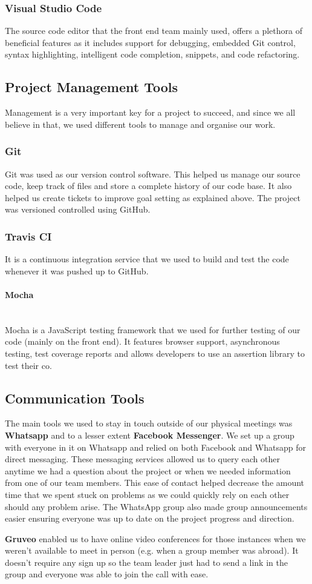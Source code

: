 \documentclass[a4paper]{report}
\newcommand{
	\subsubsubsection}[1]
{\paragraph{#1}\mbox{}\\[.35em]}
\begin{document}
	\subsubsection{Visual Studio Code}
	The source code editor that the front end team mainly used, offers a plethora of beneficial features as it includes support for debugging, embedded Git control, syntax highlighting, intelligent code completion, snippets, and code refactoring. 
	\subsection{Project Management Tools}
	Management is a very important key for a project to succeed, and since we all believe in that, we used different tools to manage and organise our work. 
	\subsubsection{Git}
	Git was used as our version control software. This helped us manage our source code, keep track of files and store a complete history of our code base. It also helped us create tickets to improve goal setting as explained above. The project was versioned controlled using GitHub.
	\subsubsection{Travis CI}
	It is a continuous integration service that we used to build and test the code whenever it was pushed up to GitHub. 
	\subsubsubsection{Mocha}
	Mocha is a JavaScript testing framework that we used for further testing of our code (mainly on the front end). It features browser support, asynchronous testing, test coverage reports and allows developers to use an assertion library to test their co. \cite{dzone_mocha_2018}
	\subsection{Communication Tools}
	
	The main tools we used to stay in touch outside of our physical meetings was \textbf{Whatsapp} and to a lesser extent \textbf{Facebook Messenger}. We set up a group with everyone in it on Whatsapp and relied on both Facebook and Whatsapp for direct messaging. These messaging services allowed us to query each other anytime we had a question about the project or when we needed information from one of our team members. This ease of contact helped decrease the amount time that we spent stuck on problems as we could quickly rely on each other should any problem arise. The WhatsApp group also made group announcements easier ensuring everyone was up to date on the project progress and direction.\newline
	\par\textbf{Gruveo} enabled us to have online video conferences for those instances when we weren't available to meet in person (e.g. when a group member was abroad). It doesn't require any sign up so the team leader just had to send a link in the group and everyone was able to join the call with ease.
	
\end{document}
